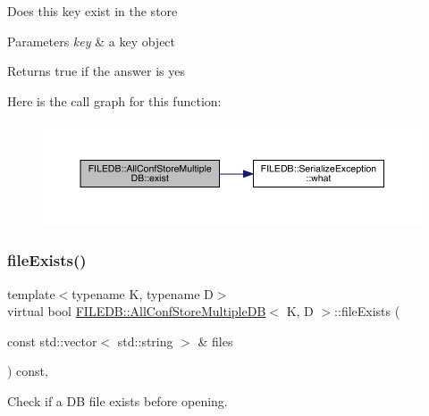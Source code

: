 Does this key exist in the store 
\begin{DoxyParams}{Parameters}
{\em key} & a key object \\
\hline
\end{DoxyParams}
\begin{DoxyReturn}{Returns}
true if the answer is yes 
\end{DoxyReturn}
Here is the call graph for this function\+:
\nopagebreak
\begin{figure}[H]
\begin{center}
\leavevmode
\includegraphics[width=350pt]{d5/dbe/classFILEDB_1_1AllConfStoreMultipleDB_a5c9333af45c37c53c863ad2a07a9843b_cgraph}
\end{center}
\end{figure}
\mbox{\label{classFILEDB_1_1AllConfStoreMultipleDB_aa5a7c38b3785226da6f30a4ab5e51428}} 
\subsubsection{\texorpdfstring{fileExists()}{fileExists()}\hspace{0.1cm}{\footnotesize\ttfamily [1/2]}}
{\footnotesize\ttfamily template$<$typename K, typename D$>$ \\
virtual bool \mbox{\hyperlink{classFILEDB_1_1AllConfStoreMultipleDB}{F\+I\+L\+E\+D\+B\+::\+All\+Conf\+Store\+Multiple\+DB}}$<$ K, D $>$\+::file\+Exists (\begin{DoxyParamCaption}\item[{const std\+::vector$<$ std\+::string $>$ \&}]{files }\end{DoxyParamCaption}) const\hspace{0.3cm}{\ttfamily [inline]}, {\ttfamily [virtual]}}

Check if a DB file exists before opening. \mbox{\label{classFILEDB_1_1AllConfStoreMultipleDB_aa5a7c38b3785226da6f30a4ab5e51428}} 
